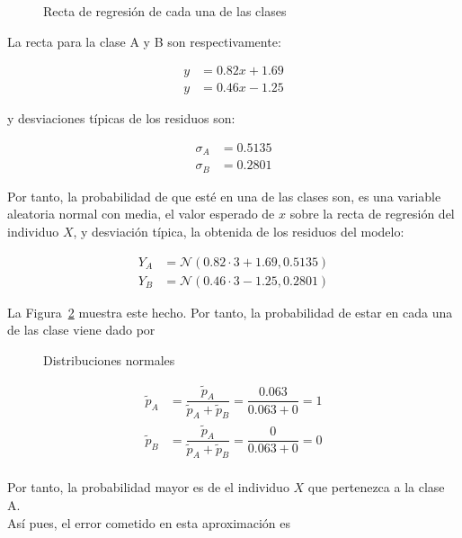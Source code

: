 \begin{ejemplo}
	\begin{figure}[htbp!]
		\centering
		\regresionred
		\caption{Recta de regresión de cada una de las clases}
		\label{fig:reg_rectas}
	\end{figure}
	
	La recta para la clase A y B son respectivamente:
	
	\begin{align*}
	y & = 0.82x + 1.69 \\
	y & = 0.46x - 1.25
	\end{align*}
	
	y desviaciones típicas de los residuos son:
	
	\begin{align*}
	\sigma_A & = 0.5135\\
	\sigma_B & = 0.2801
	\end{align*}
	
	Por tanto, la probabilidad de que esté en una de las clases son, es una variable aleatoria normal con media, el valor esperado de $x$ sobre la recta de regresión del individuo $X$, y desviación típica, la obtenida de los residuos del modelo:
	
	\begin{align*}
	Y_A & = \mathcal{N}(0.82\cdot 3 + 1.69, 0.5135)\\
	Y_B & = \mathcal{N}(0.46\cdot 3 - 1.25, 0.2801)
	\end{align*}
	
	La Figura~\ref{fig:dist_normales} muestra este hecho. Por tanto, la probabilidad de estar en cada una de las clase viene dado por 
	
	\begin{figure}[htbp!]
		\centering
		\distnormales
		\caption{Distribuciones normales}
		\label{fig:dist_normales}
	\end{figure}
	
	\begin{align*}
	\tilde{p}_A & = \dfrac{\tilde{p}_A}{\tilde{p}_A + \tilde{p}_B} = \dfrac{0.063}{0.063 + 0} = 1 \\
	\tilde{p}_B & = \dfrac{\tilde{p}_A}{\tilde{p}_A + \tilde{p}_B} = \dfrac{0}{0.063 + 0} = 0 \\
	\end{align*}
	
	Por tanto, la probabilidad mayor es de el individuo $X$ que pertenezca a la clase A.\\
	
	Así pues, el error cometido en esta aproximación es
	

\end{ejemplo}

